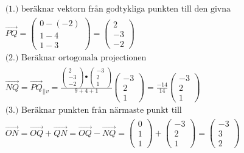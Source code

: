 \begin{align*}
  &\quad \\
  &\quad  \text{(1.) beräknar vektorn från godtykliga punkten till den givna } \\
  &\quad  \overrightarrow{PQ}=
  \begin{pmatrix} 0- (-2) \\ 1 -4 \\ 1 -3 \end{pmatrix} =
  \begin{pmatrix} 2 \\ -3 \\ -2 \end{pmatrix} \\
  &\quad  \text{(2.) Beräknar ortogonala projectionen } \\
  &\quad  \overrightarrow{NQ}=\overrightarrow{PQ}_{||v}=
  \frac{\begin{pmatrix} 2 \\ -3 \\ -2 \end{pmatrix}\bullet{}
    \begin{pmatrix} -3 \\ 2 \\ 1 \end{pmatrix}}{9+4+1}
  \begin{pmatrix} -3 \\ 2 \\ 1 \end{pmatrix} =
  \frac{-14}{14}\begin{pmatrix} -3 \\ 2 \\ 1 \end{pmatrix} \\
  &\quad  \text{(3.) Beräknar punkten från närmaste punkt till } \\
  &\quad  \overrightarrow{ON}=\overrightarrow{OQ}+\overrightarrow{QN}=
  \overrightarrow{OQ}-\overrightarrow{NQ}=
  \begin{pmatrix} 0 \\ 1 \\ 1 \end{pmatrix}+
  \begin{pmatrix} -3 \\ 2 \\ 1 \end{pmatrix}=
  \begin{pmatrix} -3 \\ 3 \\ 2 \end{pmatrix} \\

\end{align*}
